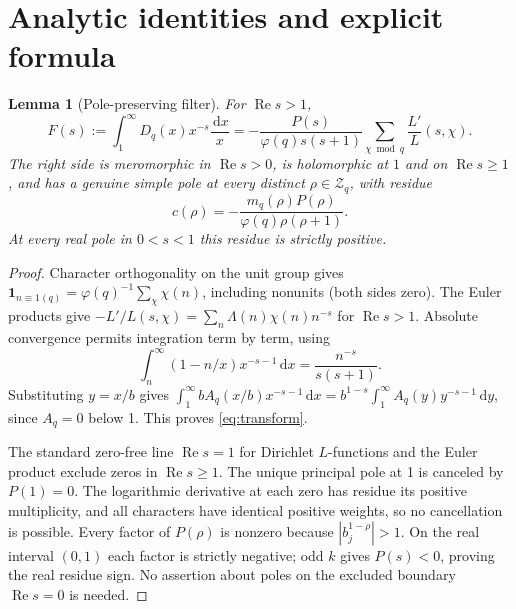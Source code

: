 \documentclass[11pt]{article}
\newtheorem{lemma}[theorem]{Lemma}
\newcommand{\Rea}{\operatorname{Re}}
\newcommand{\dd}{\,\mathrm d}
\begin{document}
\section{Analytic identities and explicit formula}
\begin{lemma}[Pole-preserving filter]\label{lem:transform}
For $\Rea s>1$,
\begin{equation}\label{eq:transform}
 F(s):=\int_1^\infty D_q(x)x^{-s}\frac{\dd x}{x}
 =-\frac{P(s)}{\varphi(q)s(s+1)}\sum_{\chi\bmod q}\frac{L'}{L}(s,\chi).
\end{equation}
The right side is meromorphic in $\Rea s>0$, is holomorphic at $1$ and on $\Rea s\ge1$, and has a genuine simple pole at every distinct $\rho\in\mathcal Z_q$, with residue
\begin{equation}\label{eq:res}
 c(\rho)=-\frac{m_q(\rho)P(\rho)}{\varphi(q)\rho(\rho+1)}.
\end{equation}
At every real pole in $0<s<1$ this residue is strictly positive.
\end{lemma}
\begin{proof}
Character orthogonality on the unit group gives $\mathbf 1_{n\equiv1(q)}=\varphi(q)^{-1}\sum_\chi\chi(n)$, including nonunits (both sides zero). The Euler products give $-L'/L(s,\chi)=\sum_n\Lambda(n)\chi(n)n^{-s}$ for $\Rea s>1$. Absolute convergence permits integration term by term, using
\[
 \int_n^\infty (1-n/x)x^{-s-1}\dd x=\frac{n^{-s}}{s(s+1)}.
\]
Substituting $y=x/b$ gives $\int_1^\infty b A_q(x/b)x^{-s-1}\dd x=b^{1-s}\int_1^\infty A_q(y)y^{-s-1}\dd y$, since $A_q=0$ below 1. This proves \eqref{eq:transform}.

The standard zero-free line $\Rea s=1$ for Dirichlet $L$-functions and the Euler product exclude zeros in $\Rea s\ge1$. The unique principal pole at 1 is canceled by $P(1)=0$. The logarithmic derivative at each zero has residue its positive multiplicity, and all characters have identical positive weights, so no cancellation is possible. Every factor of $P(\rho)$ is nonzero because $|b_j^{1-\rho}|>1$. On the real interval $(0,1)$ each factor is strictly negative; odd $k$ gives $P(s)<0$, proving the real residue sign. No assertion about poles on the excluded boundary $\Rea s=0$ is needed.
\end{proof}
\end{document}
